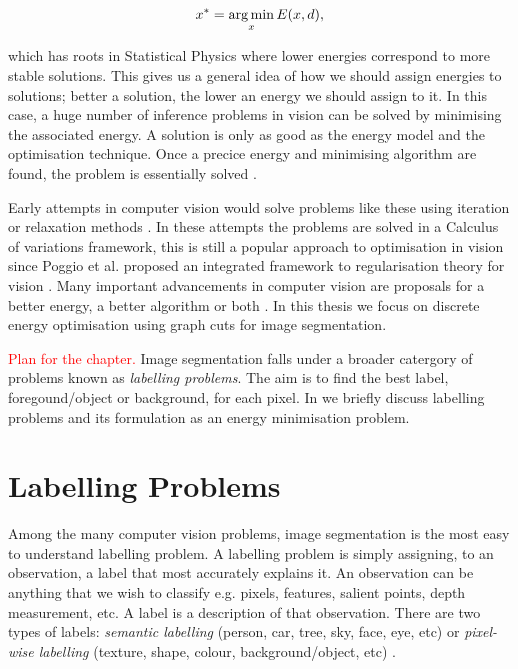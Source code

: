 \begin{equation}
	x^{*} = \operatorname*{arg\,min}_{x}E(x,d),
\end{equation}

which has roots in Statistical Physics where lower energies correspond to more stable solutions.
This gives us a general idea of how we should assign energies to solutions; better a solution, the lower an energy we should assign to it.
In this case, a huge number of inference problems in vision can be solved by minimising the associated energy.
A solution is only as good as the energy model and the optimisation technique. Once a precice energy and minimising algorithm are found, the problem is essentially solved \citep{Delong2011}. 

Early attempts in computer vision would solve problems like these using iteration or relaxation methods \citep{Waltz1975,Rosenfeld1976}.
In these attempts the problems are solved in a Calculus of variations framework, this is still a popular approach to optimisation in vision since Poggio et al. \citep{Poggio1985} proposed an integrated framework to regularisation theory for vision \citep{Sakaue1999}.
Many important advancements in computer vision are proposals for a better energy, a better algorithm or both \citep{Delong2011,Boykov2001,Kolmogorov2005,Mumford1989,Shi1997}.
In this thesis we focus on discrete energy optimisation using graph cuts for image segmentation.

\textcolor{red}{Plan for the chapter.}
Image segmentation falls under a broader catergory of problems known as \textit{labelling problems}.
The aim is to find the best label, foregound/object or background, for each pixel.
In  we briefly discuss labelling problems and its formulation as an energy minimisation problem.


\section{Labelling Problems}
\label{sec:LabellingProblems}

Among the many computer vision problems, image segmentation is the most easy to understand labelling problem.
A labelling problem is simply assigning, to an observation, a label that most accurately explains it.
An observation can be anything that we wish to classify e.g. pixels, features, salient points, depth measurement, etc.
A label is a description of that observation.
There are two types of labels: \textit{semantic labelling} (person, car, tree, sky, face, eye, etc) or \textit{pixel-wise labelling} (texture, shape, colour, background/object, etc) \citep{Delong2011,Athanasiadis2007}.

